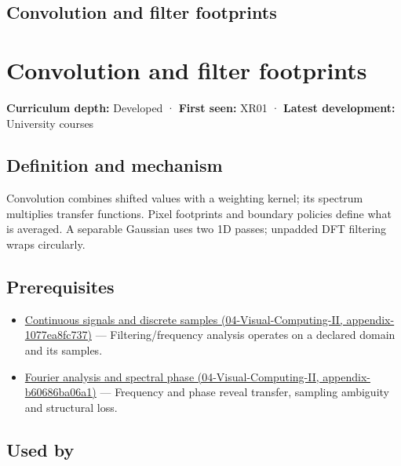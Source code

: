 \hypertarget{appendix-d5b3c692d9f0}{}
\section*{Convolution and filter footprints}
\chapter{Convolution and filter footprints}\label{appendix-d5b3c692d9f0-convolution-and-filter-footprints}

\textbf{Curriculum depth:} Developed · \textbf{First seen:} XR01 · \textbf{Latest development:} University courses

\section{Definition and mechanism}\label{appendix-d5b3c692d9f0-definition-and-mechanism}

Convolution combines shifted values with a weighting kernel; its spectrum multiplies transfer functions. Pixel footprints and boundary policies define what is averaged. A separable Gaussian uses two 1D passes; unpadded DFT filtering wraps circularly.

\section{Prerequisites}\label{appendix-d5b3c692d9f0-prerequisites}

\begin{itemize}
\tightlist
\item
  \href{../04-Visual-Computing-II/main.pdf\#nameddest=appendix-1077ea8fc737}{Continuous signals and discrete samples (04-Visual-Computing-II, appendix-1077ea8fc737)} --- Filtering/frequency analysis operates on a declared domain and its samples.
\item
  \href{../04-Visual-Computing-II/main.pdf\#nameddest=appendix-b60686ba06a1}{Fourier analysis and spectral phase (04-Visual-Computing-II, appendix-b60686ba06a1)} --- Frequency and phase reveal transfer, sampling ambiguity and structural loss.
\end{itemize}

\section{Used by}\label{appendix-d5b3c692d9f0-used-by}

